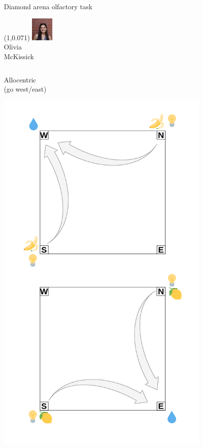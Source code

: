 \documentclass[bigger]{beamer}
\begin{document}
\begin{frame}[label={sec:org6ae2186}]{Diamond arena olfactory task}
\addtocounter{framenumber}{-1}
\begin{textblock}{0.2}(1,0.071)%
\center%
\includegraphics[width=3em]{img/olivia.jpg}\\
\scriptsize
Olivia\\McKissick
\end{textblock}
\begin{columns}
\begin{column}[t]{0.5\columnwidth}
\center
\vspace{-2em}
Allocentric\\
(go west/east)
\vspace{-1.5em}
\begin{center}
\includegraphics[width=0.8\textwidth]{img/RL_env-allo-task.drawio.png}

\end{center}
\end{column}
\end{columns}
\end{frame}
\end{document}
